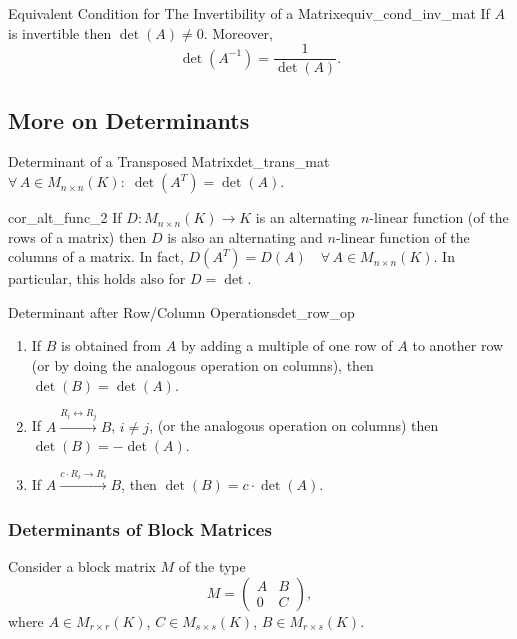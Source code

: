 \begin{corollary}{Equivalent Condition for The Invertibility of a Matrix}{equiv_cond_inv_mat}
	If $A$ is invertible then $\det(A) \neq 0$. Moreover,
	\[
		\det(A^{-1}) = \frac{1}{\det(A)}.
	\]
\end{corollary}

\subsection{More on Determinants}

\begin{theorem}{Determinant of a Transposed Matrix}{det_trans_mat}
	$\forall \, A \in M_{n\times n}(K) : \; \det(A^T) = \det(A)$.
\end{theorem}

\begin{corollary}{}{cor_alt_func_2}
	If $D:M_{n\times n}(K) \to K$ is an alternating $n$-linear function (of the rows of a matrix) then $D$ is also an alternating and $n$-linear function of the columns of a matrix. In fact, $D(A^T) = D(A) \quad \forall \, A\in M_{n\times n}(K)$. In particular, this holds also for $D = \det$.
\end{corollary}

\begin{theorem}{Determinant after Row/Column Operations}{det_row_op}
	\begin{enumerate}
		\item If $B$ is obtained from $A$ by adding a multiple of one row of $A$ to another row (or by doing the analogous operation on columns), then $\det(B) = \det(A)$.
		\item If $A \overset{R_i \leftrightarrow R_j}{\longrightarrow} B$, $i \neq j$, (or the analogous operation on columns) then $\det(B) = -\det(A)$.
		\item If $A \overset{c\cdot R_i \to R_i}{\longrightarrow} B$, then $\det(B) = c \cdot \det(A)$.
	\end{enumerate}
\end{theorem}

\subsubsection{Determinants of Block Matrices}
Consider a block matrix $M$ of the type
\[
	M = \begin{pmatrix}
		A & B\\
		0 & C
	\end{pmatrix},
\]
where $A \in M_{r\times r}(K)$, $C \in M_{s \times s}(K)$, $B \in M_{r \times s}(K)$.

